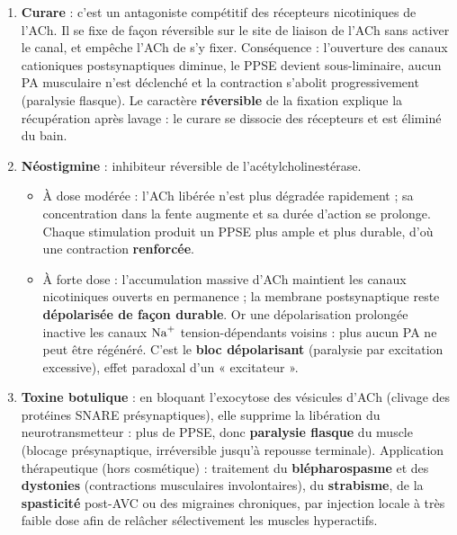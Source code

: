 \documentclass[11pt]{article}
\newcommand{\cle}[1]{{\popxbold\color{popdark}#1}}
\begin{document}
\begin{corrige}
\begin{enumerate}
    \item \textbf{Curare} : c'est un \cle{antagoniste compétitif} des récepteurs nicotiniques de l'ACh. Il se fixe de façon réversible sur le site de liaison de l'ACh sans activer le canal, et empêche l'ACh de s'y fixer. Conséquence : l'ouverture des canaux cationiques postsynaptiques diminue, le PPSE devient sous-liminaire, aucun PA musculaire n'est déclenché et la contraction s'abolit progressivement (paralysie flasque). Le caractère \textbf{réversible} de la fixation explique la récupération après lavage : le curare se dissocie des récepteurs et est éliminé du bain.
    \item \textbf{Néostigmine} : inhibiteur réversible de l'acétylcholinestérase.
    \begin{itemize}
        \item À dose modérée : l'ACh libérée n'est plus dégradée rapidement ; sa concentration dans la fente augmente et sa durée d'action se prolonge. Chaque stimulation produit un PPSE plus ample et plus durable, d'où une contraction \textbf{renforcée}.
        \item À forte dose : l'accumulation massive d'ACh maintient les canaux nicotiniques ouverts en permanence ; la membrane postsynaptique reste \textbf{dépolarisée de façon durable}. Or une dépolarisation prolongée \cle{inactive} les canaux $\ce{Na+}$ tension-dépendants voisins : plus aucun PA ne peut être régénéré. C'est le \textbf{bloc dépolarisant} (paralysie par excitation excessive), effet paradoxal d'un « excitateur ».
    \end{itemize}
    \item \textbf{Toxine botulique} : en bloquant l'exocytose des vésicules d'ACh (clivage des protéines SNARE présynaptiques), elle supprime la libération du neurotransmetteur : plus de PPSE, donc \textbf{paralysie flasque} du muscle (blocage présynaptique, irréversible jusqu'à repousse terminale). Application thérapeutique (hors cosmétique) : traitement du \textbf{blépharospasme} et des \textbf{dystonies} (contractions musculaires involontaires), du \textbf{strabisme}, de la \textbf{spasticité} post-AVC ou des migraines chroniques, par injection locale à très faible dose afin de relâcher sélectivement les muscles hyperactifs.
\end{enumerate}
\end{corrige}
\end{document}
